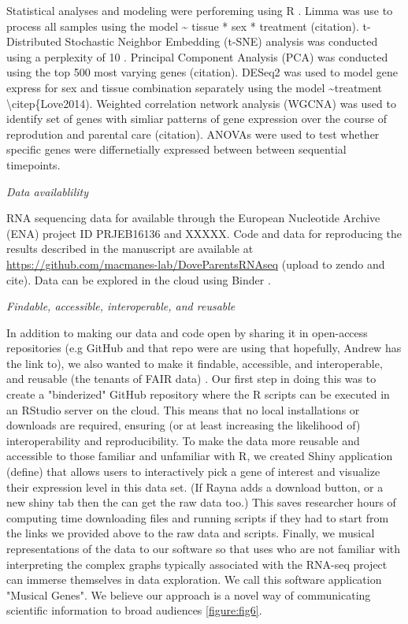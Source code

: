 Statistical analyses and modeling were perforeming using R
\citep{RDevelopmentCoreTeam2013, Wickham2016}. Limma was use to process
all samples using the model \textasciitilde{} tissue * sex * treatment
(citation). t-Distributed Stochastic Neighbor Embedding (t-SNE) analysis
was conducted using a perplexity of 10 \citep{VanDerMaaten2008}.
Principal Component Analysis (PCA) was conducted using the top 500 most
varying genes (citation). DESeq2 was used to model gene express for sex
and tissue combination separately using the model
\textasciitilde{}treatment \textbackslash{}citep\{Love2014). Weighted
correlation network analysis (WGCNA) was used to identify set of genes
with simliar patterns of gene expression over the course of reprodution
and parental care (citation). ANOVAs were used to test whether specific
genes were differnetially expressed between between sequential
timepoints.

\emph{Data availablility}

RNA sequencing data for available through the European Nucleotide
Archive (ENA) project ID PRJEB16136 and XXXXX. Code and data for
reproducing the results described in the manuscript are available at
\url{https://github.com/macmanes-lab/DoveParentsRNAseq} (upload to zendo
and cite). Data can be explored in the cloud using Binder
\citep{project_jupyter-proc-scipy-2018}.


\emph{Findable, accessible, interoperable, and reusable}

In addition to making our data and code open by sharing it in open-access repositories (e.g GitHub and that repo were are using that hopefully, Andrew has the link to), we also wanted to make it findable, accessible, and interoperable, and reusable (the tenants of FAIR data) \citep{Wilkinson2016}. Our first step in doing this was to create a "binderized" \citep{project_jupyter-proc-scipy-2018} GitHub repository where the R scripts can be executed in an RStudio server on the cloud. This means that no local installations or downloads are required, ensuring (or at least increasing the likelihood of) interoperability and reproducibility. To make the data more reusable and accessible to those familiar and unfamiliar with R, we created Shiny application (define) that allows users to interactively pick a gene of interest and visualize their expression level in this data set. (If Rayna adds a download button, or a new shiny tab then the can get the raw data too.) This saves researcher hours of computing time downloading files and running scripts if they had to start from the links we provided above to the raw data and scripts. Finally, we musical representations of the data to our software so that uses who are not familiar with interpreting the complex graphs typically associated with the RNA-seq project can immerse themselves in data exploration. We call this software application "Musical Genes". We believe our approach is a novel way of communicating scientific information to broad audiences \ref{figure:fig6}.


